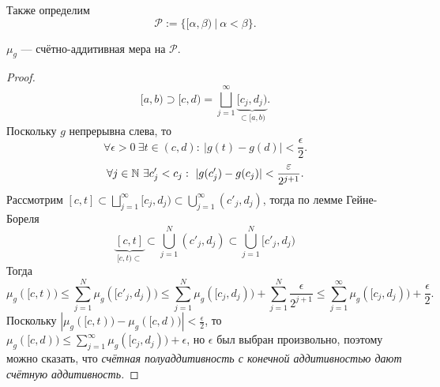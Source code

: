 \noindent Также определим
\[\mathcal{P} := \{[\alpha, \beta) \ | \ \alpha < \beta\}.\]

\begin{lemma}
    $\mu_g$ — счётно-аддитивная мера на $\mathcal{P}$.
\end{lemma} 
\begin{proof}
    \[[a,b) \supset [c,d) = \bigsqcup\limits_{j=1}^{\infty} \underbrace{[c_j, d_j)}_{\subset [a,b)}.\]
    Поскольку $g$ непрерывна слева, то 
    \[\forall \epsilon > 0 \ \exists t \in (c,d): \ |g(t) - g(d)| < \frac{\epsilon}{2}.\]
    \[\forall j \in \N \ \exists c'_j < c_j: \ |g(c'_j) - g(c_j)| < \frac{\epsilon}{2^{j+1}}.\]
    Рассмотрим $[c,t] \subset \bigsqcup\limits_{j=1}^{\infty} [c_j, d_j) \subset \bigcup\limits_{j=1}^{\infty} (c'_j, d_j)$, тогда по лемме Гейне-Бореля
    \[\underbrace{[c,t]}_{[c,t) \subset} \subset \bigcup\limits_{j=1}^{N}(c'_j, d_j) \subset \bigcup\limits_{j=1}^{N}[c'_j, d_j)\]
    Тогда
    \[\mu_g([c,t)) \leqslant \sum\limits_{j=1}^{N} \mu_g([c'_j, d_j)) \leqslant \sum\limits_{j=1}^{N} \mu_g([c_j, d_j)) + \sum\limits_{j=1}^{N} \frac{\epsilon}{2^{j+1}} \leqslant \sum\limits_{j=1}^{\infty} \mu_g([c_j, d_j)) + \frac{\epsilon}{2}.\]
    Поскольку $|\mu_g([c,t)) - \mu_g([c,d))| < \frac{\epsilon}{2}$, то $\mu_g([c,d)) \leqslant \sum\limits_{j=1}^{\infty} \mu_g([c_j, d_j)) + \epsilon$,
    но $\epsilon$ был выбран произвольно, поэтому можно сказать, что \textit{счётная полуаддитивность с конечной аддитивностью дают счётную аддитивность.}
\end{proof} 